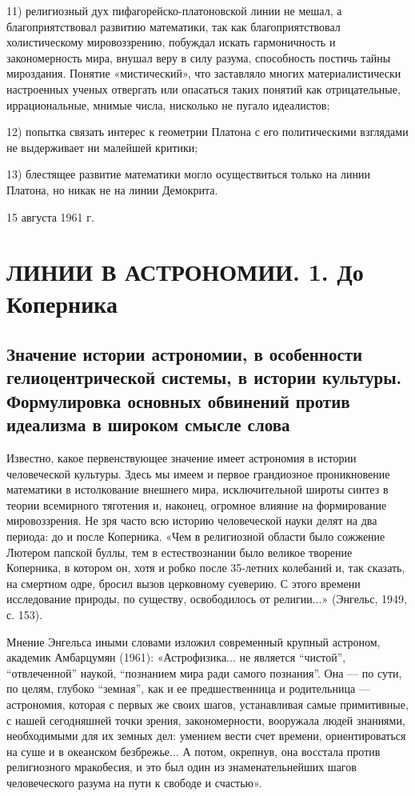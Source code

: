 11) религиозный дух пифагорейско-платоновской линии не мешал, а
благоприятствовал развитию математики, так как благоприятствовал
холистическому мировоззрению, побуждал искать гармоничность и
закономерность мира, внушал веру в силу разума, способность постичь
тайны мироздания. Понятие «мистический», что заставляло многих
материалистически настроенных ученых отвергать или опасаться таких
понятий как отрицательные, иррациональные, мнимые числа, нисколько не
пугало идеалистов;

12) попытка связать интерес к геометрии Платона с его политическими
взглядами не выдерживает ни малейшей критики;

13) блестящее развитие математики могло осуществиться только на линии
Платона, но никак не на линии Демокрита.

\begin{flushright}
        15 августа 1961 г.
\end{flushright}

\clearpage

\section{ЛИНИИ В АСТРОНОМИИ. 1. До Коперника}

\subsection{Значение истории астрономии, в особенности
гелиоцентрической системы, в истории культуры. Формулировка
основных обвинений против идеализма в широком смысле слова}

Известно, какое первенствующее значение имеет астрономия в истории
человеческой культуры. Здесь мы имеем и первое грандиозное
проникновение математики в истолкование внешнего мира, исключительной
широты синтез в теории всемирного тяготения и, наконец, огромное
влияние на формирование мировоззрения. Не зря часто всю историю
человеческой науки делят на два периода: до и после Коперника. «Чем в
религиозной области было сожжение Лютером папской буллы, тем в
естествознании было великое творение Коперника, в котором он, хотя и
робко после 35-летних колебаний и, так сказать, на смертном одре,
бросил вызов церковному суеверию. С этого времени исследование
природы, по существу, освободилось от религии...» (Энгельс, 1949, с.
153).

Мнение Энгельса иными словами изложил современный крупный астроном,
академик Амбарцумян (1961): «Астрофизика... не является ``чистой'',
``отвлеченной'' наукой, ``познанием мира ради самого познания''. Она
--- по сути, по целям, глубоко ``земная'', как и ее предшественница и
родительница --- астрономия, которая с первых же своих шагов,
устанавливая самые примитивные, с нашей сегодняшней точки зрения,
закономерности, вооружала людей знаниями, необходимыми для их земных
дел: умением вести счет времени, ориентироваться на суше и в океанском
безбрежье... А потом, окрепнув, она восстала против религиозного
мракобесия, и это был один из знаменательнейших шагов человеческого
разума на пути к свободе и счастью».


